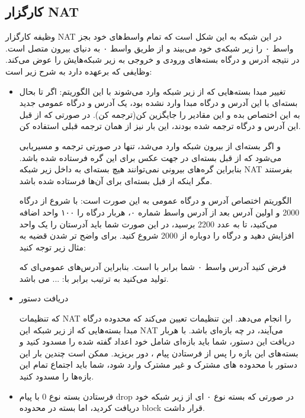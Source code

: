 \subsection{کارگزار NAT}
وظیفه کارگزار NAT در این شبکه به این شکل است که تمام واسط‌های خود بجز واسط ۰ را زیر شبکه‌ی خود می‌بیند و از طریق واسط ۰ به دنیای بیرون متصل است. در نتیجه آدرس و درگاه بسته‌های ورودی و خروجی به زیر شبکه‌هایش را عوض می‌کند.
وظایفی که برعهده دارد به شرح زیر است:
\begin{itemize}
\item
تغییر مبدا بسته‌هایی که از زیر شبکه وارد می‌شوند با این الگوریتم:
\subitem
اگر تا بحال بسته‌ای با این آدرس و درگاه مبدا وارد نشده بود، یک آدرس و درگاه عمومی جدید به این اختصاص بده و این‌ مقادیر را جایگزین کن(ترجمه کن).
\subitem
در صورتی که از قبل این آدرس و درگاه ترجمه شده بودند، این بار نیز از همان ترجمه قبلی استفاده کن.

و اگر بسته‌ای از بیرون شبکه وارد می‌شد، تنها در صورتی ترجمه و مسیریابی می‌شود که از قبل بسته‌ای در جهت عکس برای این گره فرستاده شده باشد. بنابر‌این گره‌های بیرونی نمی‌توانند هیچ بسته‌ای به داخل زیر شبکه NAT بفرستند مگر اینکه از قبل بسته‌ای برای آن‌ها فرستاده شده باشد.

الگوریتم اختصاص آدرس و درگاه عمومی به این صورت است:
با شروع از درگاه 2000 و اولین آدرس بعد از آدرس واسط شماره ۰، هربار درگاه را ۱۰۰ واحد اضافه می‌کنید، تا به عدد 2200 برسید، در این صورت شما باید آدرستان را یک واحد افزایش دهید و درگاه را دوباره از 2000 شروع کنید. برای واضح تر شدن قضیه به مثال زیر توجه کنید:

فرض کنید آدرس واسط ۰ شما برابر با
  است. بنابراین آدرس‌های عمومی‌ای که تولید می‌کنید به ترتیب برابر با:
\subitem
{}
\subitem
{}
\subitem
{}
\subitem
{}
\subitem
...
می باشد.
\item
دریافت دستور
\begin{flushleft}
\end{flushleft}
که تنظیمات NAT را انجام می‌دهد. این تنظیمات تعیین می‌کند که محدوده درگاه مبدا بسته‌هایی که از زیر شبکه این NAT می‌آیند، در چه بازه‌ای باشد. با هربار دریافت این دستور، شما باید بازه‌ای شامل خود اعداد گفته شده را مسدود کنید و بسته‌های این بازه را پس از فرستادن پیام
، دور بریزید. ممکن است چندین بار این دستور با محدوده های مشترک و غیر مشترک وارد شود، شما باید اجتماع تمام این بازه‌ها را مسدود کنید.

\item
فرستادن بسته نوع 0 با پیام drop در صورتی که بسته نوع ۰ ای از زیر شبکه خود دریافت کردید، اما بسته در محدوده block قرار داشت.
\end{itemize}
